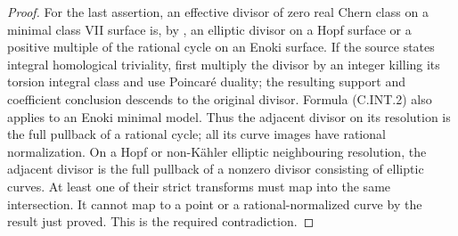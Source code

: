 \begin{proof}
For the last assertion, an effective divisor of zero
real Chern class on a minimal class VII surface is,
by \cite[Remark~2.7]{DlousskyTeleman2012}, an elliptic
divisor on a Hopf surface or a positive multiple of the
rational cycle on an Enoki surface. If the source states
integral homological triviality, first multiply the
divisor by an integer killing its torsion integral
class and use Poincar\'e duality; the resulting support
and coefficient conclusion descends to the original
divisor. Formula (C.INT.2) also applies to an Enoki
minimal model. Thus the adjacent divisor on its
resolution is the full pullback of a rational cycle;
all its curve images have rational normalization.
On a Hopf or non-K\"ahler elliptic neighbouring
resolution, the adjacent divisor is the full pullback
of a nonzero divisor consisting of elliptic curves.
At least one of their strict transforms must map
into the same intersection. It cannot map to a point
or a rational-normalized curve by the result just
proved. This is the required contradiction.
\end{proof}



